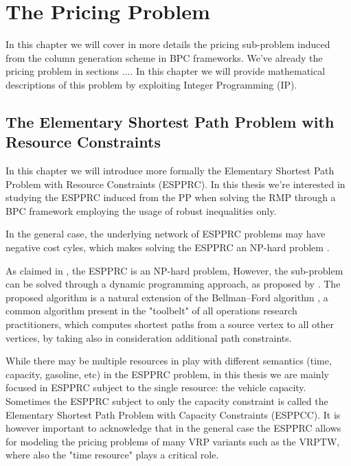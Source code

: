 \chapter{The Pricing Problem}
\label{sec:the-pricing-problem}


In this chapter we will cover in more details the pricing sub-problem
induced from the column generation scheme in BPC frameworks.
We've already the pricing problem in sections ....
In this chapter we will provide mathematical descriptions
of this problem by exploiting Integer Programming (IP).

\section{The Elementary Shortest Path Problem with Resource Constraints}
\label{sec:the-elementary-shortest-path-problem-with-resource-constraints}


In this chapter we will introduce more formally the Elementary Shortest Path Problem with Resource Constraints (ESPPRC).
In this thesis we're interested in studying the ESPPRC induced from the PP when solving the RMP through a BPC framework employing the usage of robust inequalities only.

In the general case, the underlying network of ESPPRC problems may have negative cost cyles, which makes solving the ESPPRC an NP-hard problem \parencite{dror1994}.

As claimed in \textcite{dror1994}, the ESPPRC is an NP-hard problem,
However, the sub-problem can be solved through a dynamic programming approach, as proposed by \textcite{feillet2004}.
The proposed algorithm is a natural extension of the Bellman–Ford algorithm \parencite{bellman1958, fordjr1956},
a common algorithm present in the "toolbelt" of all operations research practitioners,
which computes shortest paths from a source vertex to all other vertices,
by taking also in consideration additional path constraints.

While there may be multiple resources in play with different semantics
(time, capacity, gasoline, etc)
in the ESPPRC problem,
in this thesis we are mainly focused in ESPPRC subject to the single resource: the vehicle capacity.
Sometimes the ESPPRC subject to only the capacity constraint is called the Elementary Shortest
Path Problem with Capacity Constraints (ESPPCC).
It is however important to acknowledge that in the general case the ESPPRC allows for modeling
the pricing problems of many VRP variants such as the VRPTW, where also the "time resource"
plays a critical role.

